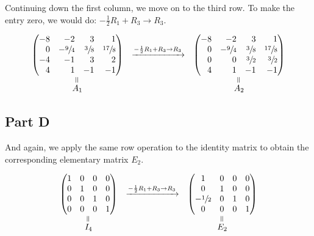 \documentclass[12pt]{article}
\newcommand{\veq}{\mathrel{\rotatebox{90}{$=$}}}
\begin{document}
Continuing down the first column, we move on to the third row. To make the entry zero, we would do: $-\frac{1}{2}R_1 + R_3 \to R_3$.

$$
\begin{array}{ccc}
    \begin{pmatrix*}[r]
        -8 & -2 & 3 & 1 \\
        0 & -\sfrac{9}{4} & \sfrac{3}{8}  & \sfrac{17}{8} \\
        -4 & -1 & 3 & 2 \\
        4 & 1 & -1 & -1
    \end{pmatrix*}
    &\xrightarrow{-\frac{1}{2}R_1 + R_3 \to R_3}
    &\begin{pmatrix*}[r]
        -8 & -2 & 3 & 1 \\
        0 & -\sfrac{9}{4} & \sfrac{3}{8}  & \sfrac{17}{8} \\
        0 & 0 & \sfrac{3}{2} & \sfrac{3}{2} \\
        4 & 1 & -1 & -1
    \end{pmatrix*}
    \\
    \overset{\veq}{A_1} & & \overset{\veq}{A_2}
\end{array}
$$

\subsection*{Part D}

And again, we apply the same row operation to the identity matrix to obtain the corresponding elementary matrix $E_2$.

$$
\begin{array}{ccc}
    \begin{pmatrix*}[c]
        1 & 0 & 0 & 0 \\
        0 & 1 & 0 & 0 \\
        0 & 0 & 1 & 0 \\
        0 & 0 & 0 & 1
    \end{pmatrix*}
    &\xrightarrow{-\frac{1}{2}R_1 + R_3 \to R_3}
    &\begin{pmatrix*}[c]
        1 & 0 & 0 & 0 \\
        0 & 1 & 0 & 0 \\
        -\sfrac{1}{2} & 0 & 1 & 0 \\
        0 & 0 & 0 & 1
    \end{pmatrix*}
    \\
    \overset{\veq}{I_4} & & \overset{\veq}{E_2}
\end{array}
$$
\end{document}
